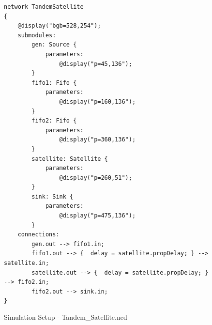 \documentclass{article}
\begin{document}
\newpage
\begin{figure}[h!]
\begin{lstlisting}
network TandemSatellite
{
    @display("bgb=528,254");
    submodules:
        gen: Source {
            parameters:
                @display("p=45,136");
        }
        fifo1: Fifo {
            parameters:
                @display("p=160,136");
        }
        fifo2: Fifo {
            parameters:
                @display("p=360,136");
        }
        satellite: Satellite {
            parameters:
                @display("p=260,51");
        }
        sink: Sink {
            parameters:
                @display("p=475,136");
        }
    connections:
        gen.out --> fifo1.in;
        fifo1.out --> {  delay = satellite.propDelay; } --> satellite.in;
        satellite.out --> {  delay = satellite.propDelay; } --> fifo2.in;
        fifo2.out --> sink.in;
}
\end{lstlisting}
\vspace{-1cm}
\caption*{Simulation Setup - Tandem\_Satellite.ned}
\end{figure}
\end{document}
